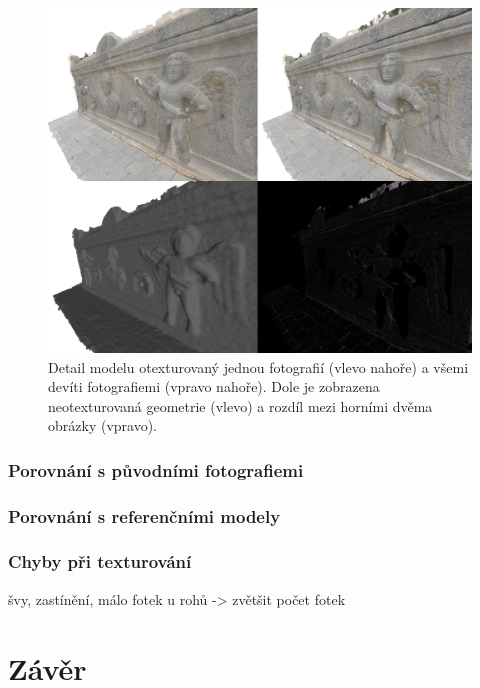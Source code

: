 \documentclass[11pt,twoside,a4paper]{book}
\begin{document}
\begin{figure}[h!]
\begin{center}
\includegraphics[width=\textwidth]{figures/test-5}
\caption{Detail modelu otexturovaný jednou fotografií (vlevo nahoře) a všemi devíti fotografiemi (vpravo nahoře). Dole je zobrazena neotexturovaná geometrie (vlevo) a rozdíl mezi horními dvěma obrázky (vpravo).}
\label{fig:test-5}
\end{center}
\end{figure}

\subsection{Porovnání s původními fotografiemi}

\subsection{Porovnání s referenčními modely}


\subsection{Chyby při texturování}
švy, zastínění, málo fotek u rohů -> zvětšit počet fotek

\chapter{Závěr}
\label{chap:end}


\renewcommand\refname{Zdroje}

\def\CS{$\cal C\kern-0.1667em\lower.5ex\hbox{$\cal S$}\kern-0.075em $}

\end{document}
